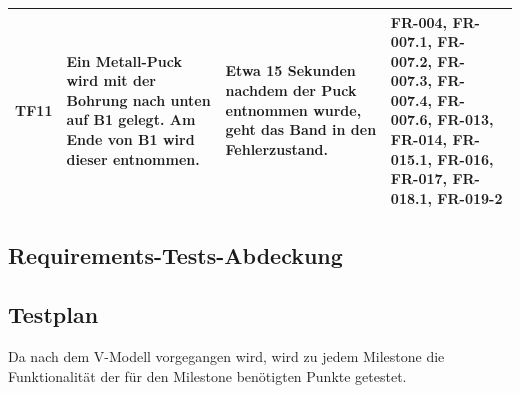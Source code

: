 \documentclass[oneside,a4paper,titlepage]{scrartcl} %
\begin{document}
\begin{small}
\begin{longtable}{|C{1.5cm}|L{4cm}|L{4.5cm}|C{3.0cm}|}
    \hline
    TF11 & Ein Metall-Puck wird mit der Bohrung nach unten auf B1 gelegt. Am Ende von B1 wird dieser entnommen. & Etwa 15 Sekunden nachdem der Puck entnommen wurde, geht das Band in den Fehlerzustand. & FR-004, FR-007.1, FR-007.2, FR-007.3, FR-007.4, FR-007.6, FR-013, FR-014, FR-015.1, FR-016, FR-017, FR-018.1, FR-019-2\\
    \hline
  \end{longtable}
\end{small}
\newpage

\subsection{Requirements-Tests-Abdeckung}

\newpage

\subsection{Testplan}
Da nach dem V-Modell vorgegangen wird, wird zu jedem Milestone die Funktionalität der für den Milestone benötigten Punkte getestet.

\end{document}
